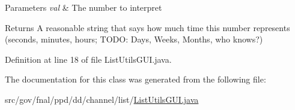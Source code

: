 \begin{DoxyParams}{Parameters}
{\em val} & The number to interpret \\
\hline
\end{DoxyParams}
\begin{DoxyReturn}{Returns}
A reasonable string that says how much time this number represents (seconds, minutes, hours; T\-O\-D\-O\-: Days, Weeks, Months, who knows?) 
\end{DoxyReturn}


Definition at line 18 of file List\-Utils\-G\-U\-I.\-java.



The documentation for this class was generated from the following file\-:\begin{DoxyCompactItemize}
\item 
src/gov/fnal/ppd/dd/channel/list/\hyperlink{ListUtilsGUI_8java}{List\-Utils\-G\-U\-I.\-java}\end{DoxyCompactItemize}
